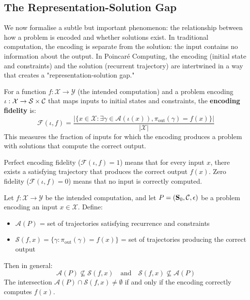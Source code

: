 \subsection{The Representation-Solution Gap}

We now formalise a subtle but important phenomenon: the relationship between how a problem is encoded and whether solutions exist. In traditional computation, the encoding is separate from the solution: the input contains no information about the output. In Poincaré Computing, the encoding (initial state and constraints) and the solution (recurrent trajectory) are intertwined in a way that creates a "representation-solution gap."

\begin{definition}
\label{def:encoding_fidelity}
For a function $f: \mathcal{X} \to \mathcal{Y}$ (the intended computation) and a problem encoding $\iota: \mathcal{X} \to \mathcal{S} \times \mathcal{C}$ that maps inputs to initial states and constraints, the \textbf{encoding fidelity} is:
\begin{equation}
\mathcal{F}(\iota, f) = \frac{|\{x \in \mathcal{X} : \exists \gamma \in \mathcal{A}(\iota(x)), \pi_{\text{out}}(\gamma) = f(x)\}|}{|\mathcal{X}|}
\label{eq:encoding_fidelity}
\end{equation}
This measures the fraction of inputs for which the encoding produces a problem with solutions that compute the correct output.
\end{definition}

Perfect encoding fidelity ($\mathcal{F}(\iota, f) = 1$) means that for every input $x$, there exists a satisfying trajectory that produces the correct output $f(x)$. Zero fidelity ($\mathcal{F}(\iota, f) = 0$) means that no input is correctly computed.

\begin{theorem}
\label{thm:representation_gap}
Let $f: \mathcal{X} \to \mathcal{Y}$ be the intended computation, and let $P = (\mathbf{S}_0, \mathcal{C}, \epsilon)$ be a problem encoding an input $x \in \mathcal{X}$. Define:
\begin{itemize}
    \item $\mathcal{A}(P)$ = set of trajectories satisfying recurrence and constraints
    \item $\mathcal{S}(f, x) = \{\gamma : \pi_{\text{out}}(\gamma) = f(x)\}$ = set of trajectories producing the correct output
\end{itemize}
Then in general:
\begin{equation}
\mathcal{A}(P) \not\subseteq \mathcal{S}(f, x) \quad \text{and} \quad \mathcal{S}(f, x) \not\subseteq \mathcal{A}(P)
\label{eq:representation_gap}
\end{equation}
The intersection $\mathcal{A}(P) \cap \mathcal{S}(f, x) \neq \emptyset$ if and only if the encoding correctly computes $f(x)$.
\end{theorem}

